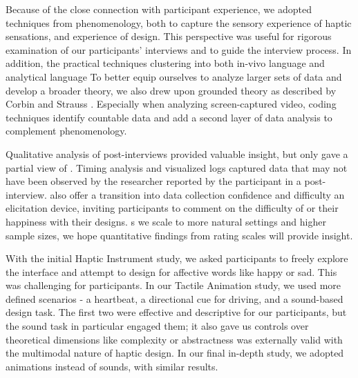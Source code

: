 Because of the close connection with participant experience, we adopted techniques from phenomenology, both to capture the sensory experience of haptic sensations, and  experience of design.
This perspective was useful for rigorous examination of our participants' interviews and to guide the interview process.
In addition, the practical techniques  clustering  into both in-vivo language and analytical language  %
To better equip ourselves to analyze larger sets of data and develop a broader theory, we also drew upon grounded theory as described by Corbin and Strauss \cite{Corbin2008}.
Especially when analyzing screen-captured video, coding techniques  identify countable data and add a second layer of data analysis to complement phenomenology.

Qualitative analysis of post-interviews provided valuable insight, but only gave a partial view of \osE{\haxd}.
Timing analysis and visualized logs captured data that may not have been observed by the researcher  reported by the participant in a post-interview.
 also offer a transition into  data collection 
 confidence and difficulty 
 an elicitation device, inviting participants to  comment on the difficulty of or their happiness with their designs.
s we scale to more natural settings and higher sample sizes, we hope quantitative findings from rating scales will provide  insight. %


With the initial Haptic Instrument study, we asked participants to freely explore the interface and attempt to design for affective words like happy or sad.
This was challenging for participants. %
In our Tactile Animation study, we used more defined scenarios - a heartbeat, a directional cue for driving, and a sound-based design task.
The first two were effective and descriptive for our participants, but the sound task in particular engaged them; it also gave us controls over theoretical dimensions like complexity or abstractness  was externally valid with the multimodal nature of haptic design.
In our final in-depth study, we adopted animations instead of sounds, with similar results.





